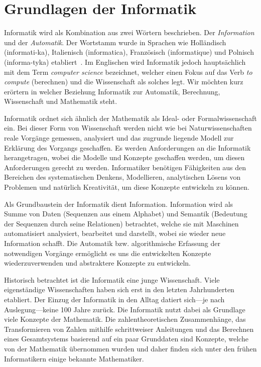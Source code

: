 \chapter{Grundlagen der Informatik}
%
Informatik wird als Kombination aus zwei Wörtern beschrieben. Der
\emph{Information} und der \emph{Automatik}. Der Wortstamm wurde in
Sprachen wie Holländisch (informati-ka), Italienisch (informatica),
Französisch (informatique) und Polnisch (informa-tyka)
etabliert~\cite[p. 21]{Balzert04}.
Im Englischen wird Informatik
jedoch hauptsächlich mit dem Term \emph{computer science} bezeichnet,
welcher einen Fokus auf das Verb \emph{to compute} (berechnen) und
die Wissenschaft als solches legt. Wir möchten kurz erörtern in
welcher Beziehung Informatik zur Automatik, Berechnung, Wissenschaft
und Mathematik steht.

Informatik ordnet sich ähnlich der Mathematik als Ideal- oder
Formalwissenschaft ein. Bei dieser Form von Wissenschaft werden nicht
wie bei Naturwissenschaften reale Vorgänge gemessen, analysiert und das
zugrunde liegende Modell zur Erklärung des Vorgangs geschaffen. Es werden
Anforderungen an die Informatik herangetragen, wobei die Modelle und
Konzepte geschaffen werden, um diesen Anforderungen gerecht zu werden.
Informatiker benötigen Fähigkeiten aus den Bereichen des systematischen
Denkens, Modellieren, analytischen Lösens von Problemen und natürlich
Kreativität, um diese Konzepte entwickeln zu können.

Als Grundbaustein der Informatik dient Information. Information
wird als Summe von Daten (Sequenzen aus einem Alphabet) und Semantik
(Bedeutung der Sequenzen durch seine Relationen) betrachtet, welche sie
mit Maschinen automatisiert analysiert, bearbeitet und darstellt, wobei
sie wieder neue Information schafft. Die Automatik bzw. algorithmische
Erfassung der notwendigen Vorgänge ermöglicht es uns die entwickelten
Konzepte wiederzuverwenden und abstraktere Konzepte zu entwickeln.

Historisch betrachtet ist die Informatik eine junge Wissenschaft. Viele
eigenständige Wissenschaften haben sich erst in den letzten Jahrhunderten
etabliert. Der Einzug der Informatik in den Alltag datiert sich---je nach
Auslegung---keine 100 Jahre zurück. Die Informatik nutzt dabei als
Grundlage viele Konzepte der Mathematik. Die zahlentheoretischen
Zusammenhänge, das Transformieren von Zahlen mithilfe schrittweiser
Anleitungen und das Berechnen eines Gesamtsystems basierend auf ein paar
Grunddaten sind Konzepte, welche von der Mathematik übernommen wurden
und daher finden sich unter den frühen Informatikern
einige bekannte Mathematiker.

